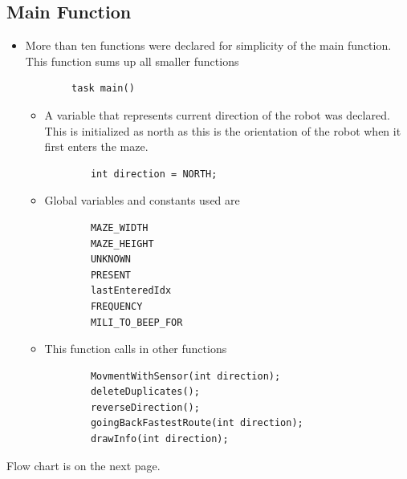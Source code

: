 \documentclass[11pt]{article}
\begin{document}

\subsection{Main Function}
\begin{itemize}
\item More than ten functions were declared for simplicity of the main function. This function sums up all smaller functions
	\begin{verbatim}
		task main()
	\end{verbatim}

	\begin{itemize}
	\item A variable that represents current direction of the robot was declared. This is initialized as north as this is the orientation of the robot when it first enters the maze.
	\begin{verbatim}
		int direction = NORTH;
	\end{verbatim}
	
	\item Global variables and constants used are
	\begin{verbatim}
		MAZE_WIDTH
		MAZE_HEIGHT
		UNKNOWN
		PRESENT
		lastEnteredIdx
		FREQUENCY
		MILI_TO_BEEP_FOR
	\end{verbatim}
	\item This function calls in other functions
	\begin{verbatim}
		MovmentWithSensor(int direction);
		deleteDuplicates();
		reverseDirection();
		goingBackFastestRoute(int direction);
		drawInfo(int direction);
	\end{verbatim}
	\end{itemize}
 

\end{itemize}
Flow chart is on the next page.
\end{document}
